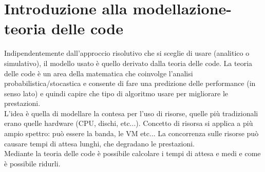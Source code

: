 \documentclass{article}
\begin{document}
\section{Introduzione alla modellazione-teoria delle code}
Indipendentemente dall'approccio risolutivo che si sceglie di usare (analitico o simulativo), il modello usato è quello derivato dalla teoria delle code. 
La teoria delle code è un area della matematica che coinvolge l'analisi probabilistica/stocastica e consente di fare una predizione delle performance (in senso lato) e quindi capire che tipo di algoritmo usare per migliorare le prestazioni.\\ L'idea è quella di modellare la contesa per l'uso di risorse, quelle più tradizionali erano quelle hardware (CPU, dischi, etc...). Concetto di risorsa si applica a più ampio spettro: può essere la banda, le VM etc... La concorrenza sulle risorse può causare tempi di attesa lunghi, che degradano le prestazioni.\\ Mediante la teoria delle code è possibile calcolare i tempi di attesa e medi e come è possibile ridurli.
\end{document}
